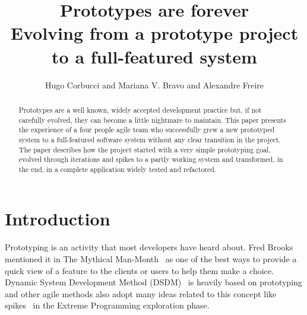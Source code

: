 \documentclass[lnbip]{svmultln}
\begin{document}
%
\mainmatter %
%
\title{Prototypes are forever\\
  Evolving from a prototype project\\ to a full-featured system}
%
%
\author{Hugo Corbucci and Mariana V. Bravo  and
  Alexandre Freire}
%
%
%

\maketitle %

\begin{abstract} %
  Prototypes are a well known, widely accepted development practice
  but, if not carefully evolved, they can become a little nightmare to
  maintain. This paper presents the experience of a four people agile
  team who successfully grew a new prototyped system to a
  full-featured software system without any clear transition in the
  project. The paper describes how the project started with a very
  simple prototyping goal, evolved through iterations and spikes to a
  partly working system and transformed, in the end, in a complete
  application widely tested and refactored.

\end{abstract}
%
\section{Introduction}

Prototyping is an activity that most developers have heard about. Fred
Brooks mentioned it in The Mythical Man-Month~\cite{Brooks1975} as one
of the best ways to provide a quick view of a feature to the clients
or users to help them make a choice. Dynamic System Development Method
(DSDM)~\cite{DSDM} is heavily based on prototyping and other agile
methods also adopt many ideas related to this concept like
spikes~\cite{XP} in the Extreme Programming exploration
phase.
\end{document}

